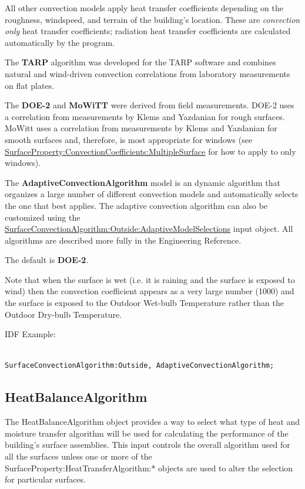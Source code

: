 All other convection models apply heat transfer coefficients depending on the roughness, windspeed, and terrain of the building's location. These are \emph{convection only} heat transfer coefficients; radiation heat transfer coefficients are calculated automatically by the program.

The \textbf{TARP} algorithm was developed for the TARP software and combines natural and wind-driven convection correlations from laboratory measurements on flat plates.

The \textbf{DOE-2} and \textbf{MoWiTT} were derived from field measurements. DOE-2 uses a correlation from measurements by Klems and Yazdanian for rough surfaces. MoWitt uses a correlation from measurements by Klems and Yazdanian for smooth surfaces and, therefore, is most appropriate for windows (see \hyperref[surfacepropertyconvectioncoefficientsmultiplesurface]{SurfaceProperty:ConvectionCoefficients:MultipleSurface} for how to apply to only windows).

The \textbf{AdaptiveConvectionAlgorithm} model is an dynamic algorithm that organizes a large number of different convection models and automatically selects the one that best applies. The adaptive convection algorithm can also be customized using the \hyperref[surfaceconvectionalgorithmoutsideadaptivemodelselections]{SurfaceConvectionAlgorithm:Outside:AdaptiveModelSelections} input object. All algorithms are described more fully in the Engineering Reference.

The default is \textbf{DOE-2}.

Note that when the surface is wet (i.e. it is raining and the surface is exposed to wind) then the convection coefficient appears as a very large number (1000) and the surface is exposed to the Outdoor Wet-bulb Temperature rather than the Outdoor Dry-bulb Temperature.

IDF Example:

\begin{lstlisting}

SurfaceConvectionAlgorithm:Outside, AdaptiveConvectionAlgorithm;
\end{lstlisting}

\subsection{HeatBalanceAlgorithm}\label{heatbalancealgorithm}

The HeatBalanceAlgorithm object provides a way to select what type of heat and moisture transfer algorithm will be used for calculating the performance of the building's surface assemblies. This input controls the overall algorithm used for all the surfaces unless one or more of the SurfaceProperty:HeatTransferAlgorithm:* objects are used to alter the selection for particular surfaces.

